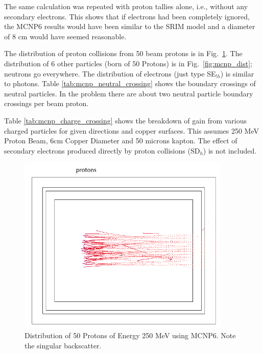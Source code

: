 \documentclass{mc2015}
\begin{document}
The same calculation was repeated with proton tallies alone, i.e., without any secondary electrons. This shows that if electrons had been completely ignored, the MCNP6 results would have been similar to the SRIM model and a diameter of 8 cm would have seemed reasonable.

The distribution of proton collisions from 50 beam protons is in Fig.~\ref{fig:mcnp_tracks}. The distribution of 6 other particles (born of 50 Protons) is in Fig.~\ref{fig:mcnp_dist}; neutrons go everywhere. The distribution of electrons (just type SE$_{!h}$) is similar to photons. Table \ref{tab:mcnp_neutral_crossing} shows the boundary crossings of neutral particles. In the problem there are about two neutral particle boundary crossings per beam proton.

Table \ref{tab:mcnp_charge_crossing} shows the breakdown of gain from various charged particles for given directions and copper surfaces. This assumes 250 MeV Proton Beam, 6cm Copper Diameter and 50 microns kapton. The effect of secondary electrons produced directly by proton collisions (SD$_h$) is not included.

\begin{figure}[H]
  \centering
  \includegraphics[width=4in]{figures/fig_mcnp_tracks.png}
  \caption{Distribution of 50 Protons of Energy 250 MeV using MCNP6. Note the singular backscatter.}
  \label{fig:mcnp_tracks}
\end{figure}
\end{document}
